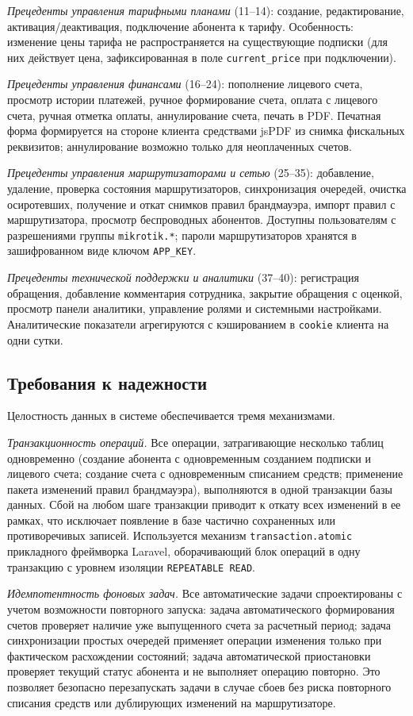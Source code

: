 \emph{Прецеденты управления тарифными планами} (11--14): создание, редактирование, активация/деактивация, подключение абонента к тарифу. Особенность: изменение цены тарифа не распространяется на существующие подписки (для них действует цена, зафиксированная в поле \texttt{current\_price} при подключении).

\emph{Прецеденты управления финансами} (16--24): пополнение лицевого счета, просмотр истории платежей, ручное формирование счета, оплата с лицевого счета, ручная отметка оплаты, аннулирование счета, печать в PDF. Печатная форма формируется на стороне клиента средствами jsPDF из снимка фискальных реквизитов; аннулирование возможно только для неоплаченных счетов.

\emph{Прецеденты управления маршрутизаторами и сетью} (25--35): добавление, удаление, проверка состояния маршрутизаторов, синхронизация очередей, очистка осиротевших, получение и откат снимков правил брандмауэра, импорт правил с маршрутизатора, просмотр беспроводных абонентов. Доступны пользователям с разрешениями группы \texttt{mikrotik.*}; пароли маршрутизаторов хранятся в зашифрованном виде ключом \texttt{APP\_KEY}.

\emph{Прецеденты технической поддержки и аналитики} (37--40): регистрация обращения, добавление комментария сотрудника, закрытие обращения с оценкой, просмотр панели аналитики, управление ролями и системными настройками. Аналитические показатели агрегируются с кэшированием в \texttt{cookie} клиента на одни сутки.

\subsection{Требования к надежности}

Целостность данных в системе обеспечивается тремя механизмами.

\emph{Транзакционность операций.} Все операции, затрагивающие несколько таблиц одновременно (создание абонента с одновременным созданием подписки и лицевого счета; создание счета с одновременным списанием средств; применение пакета изменений правил брандмауэра), выполняются в одной транзакции базы данных. Сбой на любом шаге транзакции приводит к откату всех изменений в ее рамках, что исключает появление в базе частично сохраненных или противоречивых записей. Используется механизм \texttt{transaction.atomic} прикладного фреймворка Laravel, оборачивающий блок операций в одну транзакцию с уровнем изоляции \texttt{REPEATABLE READ}.

\emph{Идемпотентность фоновых задач.} Все автоматические задачи спроектированы с учетом возможности повторного запуска: задача автоматического формирования счетов проверяет наличие уже выпущенного счета за расчетный период; задача синхронизации простых очередей применяет операции изменения только при фактическом расхождении состояний; задача автоматической приостановки проверяет текущий статус абонента и не выполняет операцию повторно. Это позволяет безопасно перезапускать задачи в случае сбоев без риска повторного списания средств или дублирующих изменений на маршрутизаторе.

